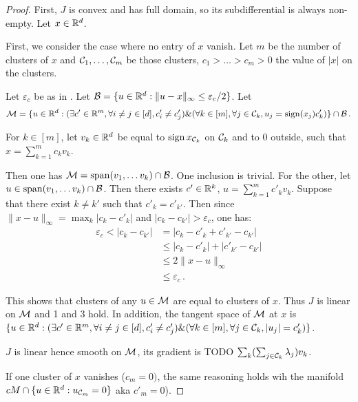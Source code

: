 \begin{proof}
  First, $J$ is convex and has full domain, so its subdifferential is always non-empty.
  Let $x \in \mathbb{R}^d$.

  First, we consider the case where no entry of $x$ vanish.
  Let $m$ be the number of clusters of $x$ and $\mathcal{C}_1, \ldots, \mathcal{C}_m$ be those clusters, $c_1 > \ldots > c_m > 0$ the value of $\lvert x \rvert$ on the clusters.

  Let $\varepsilon_c$ be as in .
  Let $\mathcal{B} = \{u \in \mathbb{R}^d: \lVert u - x \rVert_\infty \leq \varepsilon_c / 2\}$.
  Let
  \begin{equation}
    \mathcal{M} = \{ u \in \mathbb{R}^d : (\exists c' \in \mathbb{R}^m, \forall i \neq j \in [d], c'_i \neq c'_j) \& (\forall k \in [m], \forall j \in \mathcal{C}_k, u_j = \operatorname{sign}(x_j) c'_k) \} \cap \mathcal{B} \, .
  \end{equation}

  For $k \in [m]$, let $v_k \in \mathbb{R}^d$ be equal to $\operatorname{sign} x_{\mathcal{C}_k}$ on $\mathcal{C}_k$ and to 0 outside, such that $x = \sum_{k=1}^m c_k v_k$.

  Then one has $\mathcal{M} = \operatorname{span}(v_1, \ldots v_k) \cap \mathcal{B}$.
  One inclusion is trivial.
  For the other, let $u \in \operatorname{span}(v_1, \ldots v_k) \cap \mathcal{B}$.
  Then there exists $c' \in \mathbb{R}^k$, $u = \sum_{k=1}^m c'_k v_k$.
  Suppose that there exist $k \neq k'$ such that $c'_k = c'_{k'}$.
  Then since $\lVert x - u \rVert_\infty = \max_k |c_k - c'_k|$ and $|c_k - c_{k'}| > \varepsilon_c$, one has:
  \begin{align*}
     \varepsilon_c < |c_k - c_{k'}|
     &= |c_k - c'_k + c'_{k'} - c_{k'}| \\
     &\leq |c_k - c'_k| + |c'_{k'} - c_{k'}| \\
     &\leq 2 \lVert x - u \rVert_\infty \\
     &\leq  \varepsilon_c \, .
  \end{align*}

  This shows that clusters of any $u \in \mathcal{M}$ are equal to clusters of $x$.
  Thus $J$ is linear on $\mathcal{M}$ and 1 and 3 hold. 
  In addition, the tangent space of $\mathcal{M}$ at $x$ is $\{ u \in \mathbb{R}^d : (\exists c' \in \mathbb{R}^m, \forall i \neq j \in [d], c'_i \neq c'_j) \& (\forall k \in [m], \forall j \in \mathcal{C}_k, |u_j| = c'_k) \}$.

  $J$ is linear hence smooth on $\mathcal{M}$, its gradient is TODO $\sum_k (\sum_{j \in \mathcal{C}_k} \lambda_j) v_k$. 

  If one cluster of $x$ vanishes ($c_m = 0)$, the same reasoning holds wih the manifold $cM \cap \{u \in \mathbb{R}^d: u_{\mathcal{C}_m} = 0\}$ aka $c'_m = 0$).
\end{proof}